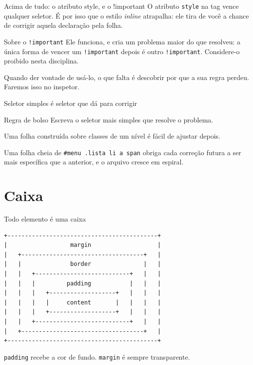 \documentclass{beamer}
\begin{document}
\begin{frame}{Acima de tudo: o atributo style, e o !important}
	O atributo \texttt{style} na tag vence qualquer seletor. É por isso que o
	estilo \emph{inline} atrapalha: ele tira de você a chance de corrigir aquela
	declaração pela folha.

	\vspace{0.4cm}
	\begin{alertblock}{Sobre o \texttt{!important}}
		Ele funciona, e cria um problema maior do que resolveu: a única forma de
		vencer um \texttt{!important} depois é outro \texttt{!important}. Considere-o
		proibido nesta disciplina.
	\end{alertblock}

	\vspace{0.3cm}
	Quando der vontade de usá-lo, o que falta é descobrir por que a sua regra
	perdeu. Faremos isso no inspetor.
\end{frame}

\begin{frame}{Seletor simples é seletor que dá para corrigir}
	\begin{block}{Regra de bolso}
		Escreva o seletor mais simples que resolve o problema.
	\end{block}

	\vspace{0.5cm}
	Uma folha construída sobre classes de um nível é fácil de ajustar depois.

	\vspace{0.3cm}
	Uma folha cheia de \texttt{\#menu .lista li a span} obriga cada correção
	futura a ser mais específica que a anterior, e o arquivo cresce em espiral.
\end{frame}

\section{Caixa}

\begin{frame}[fragile]{Todo elemento é uma caixa}
	\begin{verbatim}
+-------------------------------------------+
|                  margin                   |
|   +-----------------------------------+   |
|   |              border               |   |
|   |   +---------------------------+   |   |
|   |   |         padding           |   |   |
|   |   |   +-------------------+   |   |   |
|   |   |   |     content       |   |   |   |
|   |   |   +-------------------+   |   |   |
|   |   +---------------------------+   |   |
|   +-----------------------------------+   |
+-------------------------------------------+
  \end{verbatim}

	\vspace{0.2cm}
	\texttt{padding} recebe a cor de fundo. \texttt{margin} é sempre transparente.
\end{frame}
\end{document}
